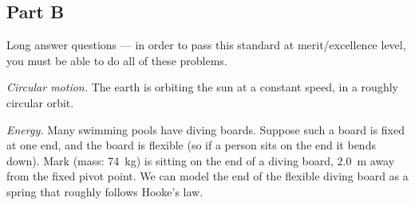 \documentclass[answers]{exam}
\begin{document}
\subsection*{Part B}
Long answer questions --- in order to pass this standard at merit/excellence level,
you must be able to do all of these problems.
\begin{questions}
  \question \textit{Circular motion.} The earth is orbiting the sun at a constant speed, in a roughly circular orbit.
  \question \textit{Energy.} Many swimming pools have diving boards. Suppose such a board is fixed at one end, and the board
            is flexible (so if a person sits on the end it bends down). Mark (mass: \SI{74}{\kilo\gram}) is
            sitting on the end of a diving board, \SI{2.0}{\metre} away from the fixed pivot point. We can
            model the end of the flexible diving board as a spring that roughly follows Hooke's law.
\end{questions}
\end{document}
